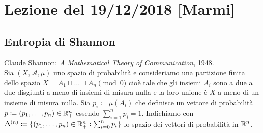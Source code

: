 \section{Lezione del 19/12/2018 [Marmi]}

\subsection{Entropia di Shannon}
Claude Shannon: \emph{A Mathematical Theory of Communication}, 1948. \\

Sia $ (X, \mathcal{A}, \mu) $ uno spazio di probabilità e consideriamo una partizione finita dello spazio \linebreak $ X = A_1 \sqcup \ldots \sqcup A_n \pmod{0} $ cioè tale che gli insiemi $ A_i $ sono a due a due disgiunti a meno di insiemi di misura nulla e la loro unione è $ X $ a meno di un insieme di misura nulla. Sia $ p_i \coloneqq \mu(A_i) $ che definisce un vettore di probabilità $ p \coloneqq (p_1, \ldots, p_n) \in \mathbb{R}^n_+ $ essendo $ \sum_{i = 1}^{n} p_i = 1 $. Indichiamo con $ \Delta^{(n)} \coloneqq \{(p_1, \ldots, p_n) \in \mathbb{R}^n_+ : \sum_{i=0}^{n} p_i\} $ lo spazio dei vettori di probabilità in $ \mathbb{R}^n $.

